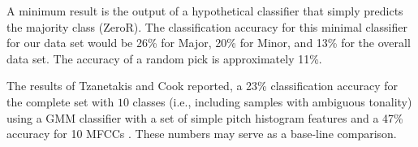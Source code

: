 \documentclass{article}
\begin{document}
A minimum result is the output of a hypothetical classifier that simply predicts the majority class (ZeroR). The classification accuracy for this minimal classifier for our data set would be 26\% for Major, 20\% for Minor, and 13\% for the overall data set. The accuracy of a random pick is approximately 11\%.

The results of Tzanetakis and Cook  reported, a 23\% classification accuracy  for the complete set with $10$ classes (i.e., including samples with ambiguous tonality) using a GMM classifier with a set of simple pitch histogram features and a 47\% accuracy for 10 MFCCs \cite{tzanetakis_musical_2002}. These numbers may serve as a base-line comparison. 


\end{document}
